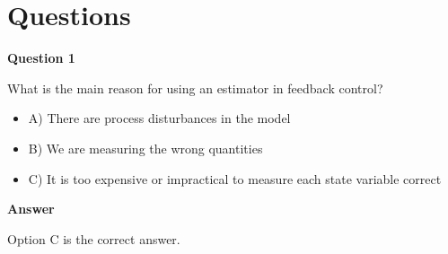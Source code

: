 \section{Questions}

\textbf{Question 1}

What is the main reason for using an estimator in feedback control?

\begin{itemize}
\item A) There are process disturbances in the model 
\item B) We are measuring the wrong quantities 
\item C) It is too expensive or impractical to measure each state variable correct 
\end{itemize} 

\textbf{Answer}  

Option C is the correct answer.

